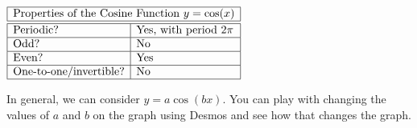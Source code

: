 \documentclass[nooutcomes]{ximera}
\begin{document}
\begin{center}
$
\begin{array}{|l|l|}
 \hline
 \multicolumn{2}{|c|}{\text{\normalfont Properties of the Cosine Function } y=\cos(x)} \\
\hline
 \hline
\text{Periodic?} & \text{Yes, with period }2\pi \\ \hline
\text{Odd?} & \text{No} \\ \hline
\text{Even?} & \text{Yes} \\ \hline
\text{One-to-one/invertible?} & \text{No} \\ \hline
\end{array}
$
\end{center}

In general, we can consider $y=a\cos(bx)$.  You can play with changing the values of $a$ and $b$ on the graph using Desmos and see how that changes the graph.  

\begin{center}  
\end{center}
\end{document}
